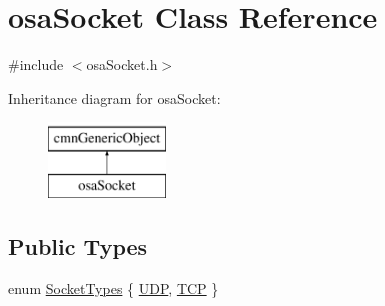 \hypertarget{classosa_socket}{}\section{osa\+Socket Class Reference}
\label{classosa_socket}


{\ttfamily \#include $<$osa\+Socket.\+h$>$}

Inheritance diagram for osa\+Socket\+:\begin{figure}[H]
\begin{center}
\leavevmode
\includegraphics[height=2.000000cm]{d9/d26/classosa_socket}
\end{center}
\end{figure}
\subsection*{Public Types}
\begin{DoxyCompactItemize}
\item 
enum \hyperlink{classosa_socket_adeb99e6a5b2d4e503e0308ccb9677a00}{Socket\+Types} \{ \hyperlink{classosa_socket_adeb99e6a5b2d4e503e0308ccb9677a00a30ff2c2d5d46158f56ac6d521629612a}{U\+D\+P}, 
\hyperlink{classosa_socket_adeb99e6a5b2d4e503e0308ccb9677a00a285ce3d0ac4094f708fa3f7b2f222430}{T\+C\+P}
 \}
\end{DoxyCompactItemize}
